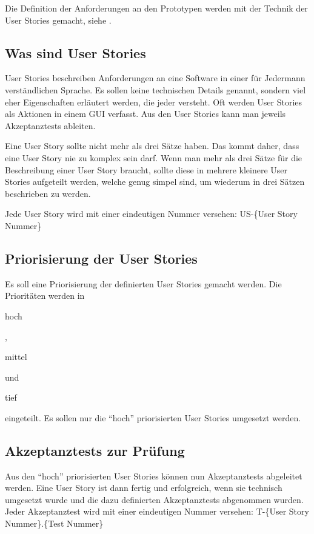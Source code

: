   Die Definition der Anforderungen an den Prototypen werden mit der Technik der
  User Stories gemacht, siehe \cite{UserStories}.
  
  \subsection{Was sind User Stories}
  
  User Stories beschreiben Anforderungen an eine Software in einer für Jedermann
  verständlichen Sprache. Es sollen keine technischen Details genannt, sondern
  viel eher Eigenschaften erläutert werden, die jeder versteht. Oft werden User
  Stories als Aktionen in einem \ac{GUI} verfasst. Aus den User Stories kann
  man jeweils Akzeptanztests \cite{AcceptanceTests} ableiten.
  
  Eine User Story sollte nicht mehr als drei Sätze haben. Das kommt daher, dass
  eine User Story nie zu komplex sein darf. Wenn man mehr als drei Sätze für die
  Beschreibung einer User Story braucht, sollte diese in mehrere kleinere User
  Stories aufgeteilt werden, welche genug simpel sind, um wiederum in drei
  Sätzen beschrieben zu werden.
  
  Jede User Story wird mit einer eindeutigen Nummer versehen: US-\{User Story
  Nummer\}
  
  \subsection{Priorisierung der User Stories}
  
  Es soll eine Priorisierung der definierten User Stories gemacht werden. Die
  Prioritäten werden in \begin{itshape}hoch\end{itshape},
  \begin{itshape}mittel\end{itshape} und
  \begin{itshape}tief\end{itshape} eingeteilt. Es sollen nur die ``hoch''
  priorisierten User Stories umgesetzt werden.
  
  \subsection{Akzeptanztests zur Prüfung}
  
  Aus den ``hoch'' priorisierten User Stories können nun Akzeptanztests
  abgeleitet werden. Eine User Story ist dann fertig und erfolgreich,
  wenn sie technisch umgesetzt wurde und die dazu definierten Akzeptanztests
  abgenommen wurden. Jeder Akzeptanztest wird mit einer eindeutigen Nummer
  versehen: T-\{User Story Nummer\}.\{Test Nummer\}
  
